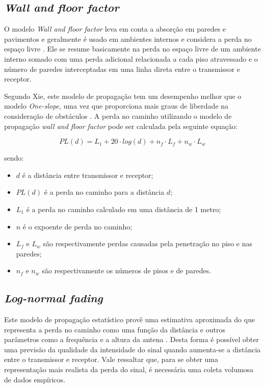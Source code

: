 \documentclass[
	12pt,				%
	twoside,			%
	a4paper,			%
	english,			%
	french,				%
	spanish,			%
	brazil				%
	]{abntex2}
\begin{document}
\subsection{\texorpdfstring{\emph{Wall and floor
factor}}{Wall and floor factor}}\label{sec:wall_floor}

O modelo \emph{Wall and floor factor} leva em conta a absorção em
paredes e pavimentos e geralmente é usado em ambientes internos e
considera a perda no espaço livre \cite{LUO, RAPPAPORT}. Ele se resume
basicamente na perda no espaço livre de um ambiente interno somado com
uma perda adicional relacionada a cada piso atravessado e o número de
paredes interceptadas em uma linha direta entre o transmissor e
receptor.

Segundo Xie, este modelo de propagação tem um desempenho melhor que o
modelo \emph{One-slope}, uma vez que proporciona mais graus de liberdade
na consideração de obstáculos \cite{XIE}. A perda no caminho utilizando
o modelo de propagação \emph{wall and floor factor} pode ser calculada
pela seguinte equação:

\begin{equation}
    PL(d) = L_{1} + 20 \cdot log(d) + n_{f} \cdot L_{f} + n_{w} \cdot L_{w}
\end{equation}

sendo:

\begin{itemize}
\item
  \(d\) é a distância entre transmissor e receptor;
\item
  \(PL(d)\) é a perda no caminho para a distância \(d\);
\item
  \(L_{1}\) é a perda no caminho calculado em uma distância de 1 metro;
\item
  \(n\) é o expoente de perda no caminho;
\item
  \(L_{f}\) e \(L_{w}\) são respectivamente perdas causadas pela
  penetração no piso e nas paredes;
\item
  \(n_{f}\) e \(n_{w}\) são respectivamente os números de pisos e de
  paredes.
\end{itemize}

\subsection{\texorpdfstring{\emph{Log-normal
fading}}{Log-normal fading}}\label{sec:log_normal_fading}

Este modelo de propagação estatístico provê uma estimativa aproximada do
que representa a perda no caminho como uma função da distância e outros
parâmetros como a frequência e a altura da antena \cite{BUDGETS}. Desta
forma é possível obter uma previsão da qualidade da intensidade do sinal
quando aumenta-se a distância entre o transmissor e receptor. Vale
ressaltar que, para se obter uma representação mais realista da perda do
sinal, é necessária uma coleta volumosa de dados empíricos.
\end{document}
